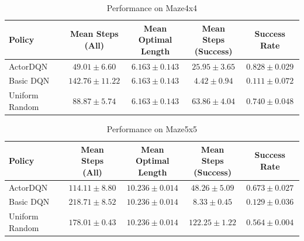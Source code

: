 \documentclass[a4paper,12pt]{article}
\begin{document}
\begin{table}[htbp]
    \centering
    \caption{Performance on Maze4x4}
    \small
    \setlength{\tabcolsep}{4pt}
    \begin{tabular}{lcccc}
        \hline
        Policy 
        & \shortstack{Mean Steps\\(All)}
        & \shortstack{Mean Optimal\\Length}
        & \shortstack{Mean Steps\\(Success)}
        & Success Rate \\
        \hline

        ActorDQN
        & $\mathbf{49.01 \pm 6.60}$
        & $6.163 \pm 0.143$
        & $25.95 \pm 3.65$
        & $\mathbf{0.828 \pm 0.029}$ \\

        Basic DQN
        & $142.76 \pm 11.22$
        & $6.163 \pm 0.143$
        & $\mathbf{4.42 \pm 0.94}$
        & $0.111 \pm 0.072$ \\

        Uniform Random
        & $88.87 \pm 5.74$
        & $6.163 \pm 0.143$
        & $63.86 \pm 4.04$
        & $0.740 \pm 0.048$ \\

        \hline
    \end{tabular}
    \label{tab:maze4x4}
\end{table}

\begin{table}[htbp]
    \centering
    \caption{Performance on Maze5x5}
    \small
    \setlength{\tabcolsep}{4pt}
    \begin{tabular}{lcccc}
        \hline
        Policy 
        & \shortstack{Mean Steps\\(All)}
        & \shortstack{Mean Optimal\\Length}
        & \shortstack{Mean Steps\\(Success)}
        & Success Rate \\
        \hline

        ActorDQN
        & $\mathbf{114.11 \pm 8.80}$
        & $10.236 \pm 0.014$
        & $48.26 \pm 5.09$
        & $\mathbf{0.673 \pm 0.027}$ \\

        Basic DQN
        & $218.71 \pm 8.52$
        & $10.236 \pm 0.014$
        & $\mathbf{8.33 \pm 0.45}$
        & $0.129 \pm 0.036$ \\

        Uniform Random
        & $178.01 \pm 0.43$
        & $10.236 \pm 0.014$
        & $122.25 \pm 1.22$
        & $0.564 \pm 0.004$ \\

        \hline
    \end{tabular}
    \label{tab:maze5x5}
\end{table}
\end{document}

